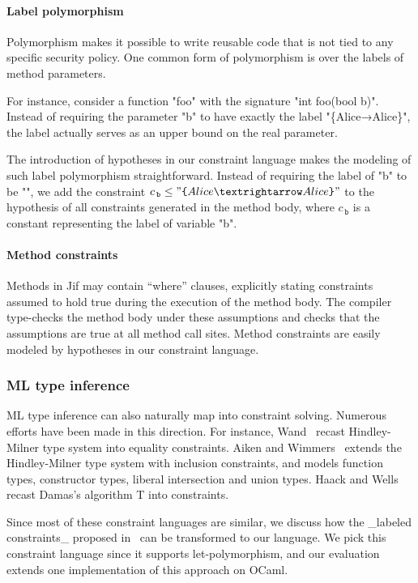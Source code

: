 \paragraph{Label polymorphism}

Polymorphism makes it possible to write reusable code that is not tied
to any specific security policy. One common form of polymorphism is
over the labels of method parameters. 

For instance, consider a function "foo"
with the signature "int foo(bool b)".
Instead of requiring the parameter "b" to have exactly the label
"\{Alice→Alice\}", the label actually serves as an upper bound on the
real parameter.

The introduction of hypotheses in our constraint language makes the
modeling of such label polymorphism straightforward. Instead of
requiring the label of "b" to
be "", we add the constraint $c_{\,\texttt{b}} \leq
"\lab{Alice→Alice}"$ to the hypothesis of all constraints generated in the
method body, where $c_{\,\texttt{b}}$ is a constant representing the label of
variable "b".

\paragraph{Method constraints}

Methods in Jif may contain ``where'' clauses, explicitly stating
constraints assumed to hold true during the execution of the method
body. The compiler type-checks the method body under these assumptions
and checks that the assumptions are true at all method call sites. 
Method constraints are easily modeled by hypotheses in our
constraint language.
 
\subsubsection{ML type inference}

ML type inference can also naturally map into constraint solving. Numerous 
efforts have been made in this direction. For instance,
Wand~\cite{wand-typeinference} recast Hindley-Milner type system into equality
constraints. Aiken and Wimmers~\cite{aiken-typeinclusion} extends the
Hindley-Milner type system with inclusion constraints, and models function
types, constructor types, liberal intersection and union types. Haack and Wells
~\cite{haack:slicing} recast Damas’s algorithm T into constraints.

Since most of these constraint languages are similar, we discuss how
the _labeled constraints_ proposed in~\cite{haack:slicing} can be
transformed to our language. We pick this constraint language since it
supports let-polymorphism, and our evaluation extends one
implementation of this approach on OCaml.

